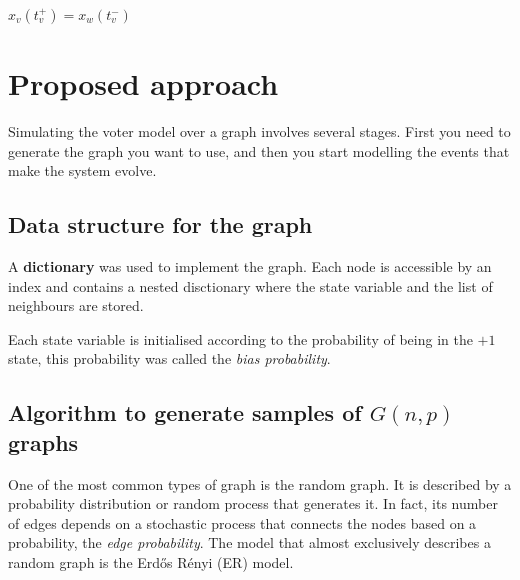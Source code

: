 \documentclass[conference]{IEEEtran}
\begin{document}
\begin{center}
    \begin{math}
        x_v(t_v^+) = x_w(t_v^-)
    \end{math}
\end{center}

\section{Proposed approach}

Simulating the voter model over a graph involves several stages. 
%
First you need to generate the graph you want to use, and then you start modelling the events that make the system evolve.

    \subsection{Data structure for the graph}

    A \textbf{dictionary} was used to implement the graph. 
    Each node is accessible by an index and contains a nested disctionary where the state variable and the list of neighbours are stored. 

    Each state variable is initialised according to the probability of being in the $+1$ state, this probability was called the \textit{bias probability}. 

    \subsection{Algorithm to generate samples of $G(n,p)$ graphs}
    
    One of the most common types of graph is the random graph. 
    It is described by a probability distribution or random process that generates it. 
    In fact, its number of edges depends on a stochastic process that connects the nodes based on a probability, the \textit{edge probability}. 
    The model that almost exclusively describes a random graph is the Erdős Rényi (ER) model. 
\end{document}
